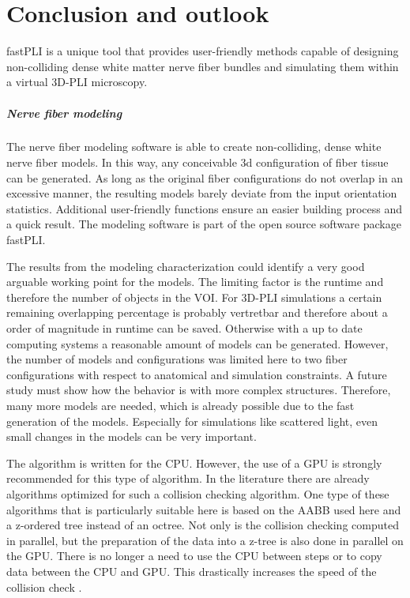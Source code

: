 \setcounter{chapter}{8}
\chapter{Conclusion and outlook}
\label{sec:summary}
% 
\ac{fastPLI} is a unique tool that provides user-friendly methods capable of designing non-colliding dense white matter nerve fiber bundles and simulating them within a virtual \ac{3D-PLI} microscopy.
% 
% 
% 
\paragraph{Nerve fiber modeling} %
The nerve fiber modeling software is able to create non-colliding, dense white nerve fiber models.
In this way, any conceivable 3d configuration of fiber tissue can be generated.
As long as the original fiber configurations do not overlap in an excessive manner, the resulting models barely deviate from the input orientation statistics.
Additional user-friendly functions ensure an easier building process and a quick result.
The modeling software is part of the open source software package \ac{fastPLI}.
\par
% 
The results from the modeling characterization could identify a very good arguable working point for the models.
The limiting factor is the runtime and therefore the number of objects in the \ac{VOI}.
For \ac{3D-PLI} simulations a certain remaining overlapping percentage is probably vertretbar and therefore about a order of magnitude in runtime can be saved.
Otherwise with a up to date computing systems a reasonable amount of models can be generated.
However, the number of models and configurations was limited here to two fiber configurations with respect to anatomical and simulation constraints.
A future study must show how the behavior is with more complex structures.
Therefore, many more models are needed, which is already possible due to the fast generation of the models.
Especially for simulations like scattered light, even small changes in the models can be very important.
\par
% 
The algorithm is written for the \ac{CPU}.
However, the use of a \ac{GPU} is strongly recommended for this type of algorithm.
In the literature there are already algorithms optimized for such a collision checking algorithm.
One type of these algorithms that is particularly suitable here is based on the \ac{AABB} used here and a z-ordered tree instead of an octree.
Not only is the collision checking computed in parallel, but the preparation of the data into a z-tree is also done in parallel on the \ac{GPU}.
There is no longer a need to use the \ac{CPU} between steps or to copy data between the \ac{CPU} and \ac{GPU}.
This drastically increases the speed of the collision check \cite{Karras2012}. 
% 
% 
% 
